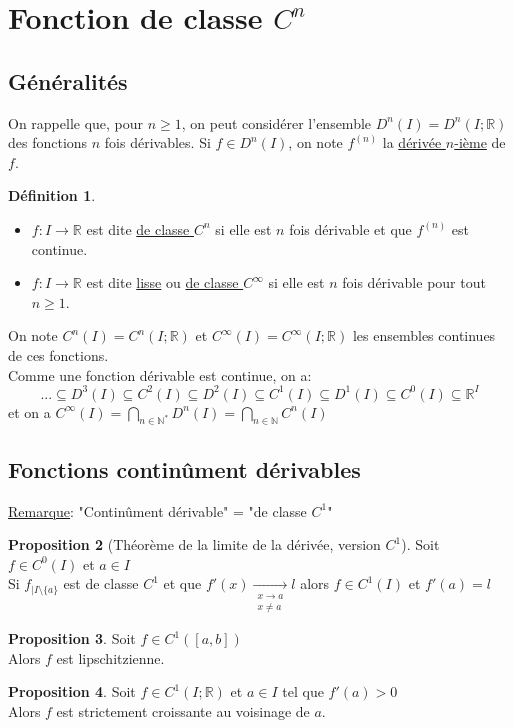 \documentclass[10pt,a4paper]{article}
\theoremstyle{definition}
\newtheorem{proposition}{Proposition}[section]
\newtheorem{definition}[proposition]{Définition}
\begin{document}
\section{Fonction de classe $C^n$}
\subsection{Généralités}
On rappelle que, pour $n \geq 1$, on peut considérer l'ensemble $D^n(I) = D^n(I; \mathbb{R})$ des fonctions $n$ fois dérivables. Si $f \in D^n(I)$, on note $f^{(n)}$ la \uline{dérivée $n$-ième} de $f$.
\begin{definition}
\hfill
\begin{itemize}
\item $f: I \to \mathbb{R}$ est dite \uline{de classe $C^n$} si elle est $n$ fois dérivable et que $f^{(n)}$ est continue.
\item $f: I \to \mathbb{R}$ est dite \uline{lisse} ou \uline{de classe $C^\infty$} si elle est $n$ fois dérivable pour tout $n \geq 1$.
\end{itemize}
On note $C^n(I) = C^n(I; \mathbb{R})$ et $C^\infty(I) = C^\infty(I; \mathbb{R})$ les ensembles continues de ces fonctions. \\
Comme une fonction dérivable est continue, on a:
\[ ... \subseteq D^3(I) \subseteq C^2(I) \subseteq D^2(I) \subseteq C^1(I) \subseteq D^1(I) \subseteq C^0(I) \subseteq \mathbb{R}^I\]
et on a $C^\infty(I) = \bigcap\limits_{n \in \mathbb{N}^*} D^n(I) = \bigcap\limits_{n \in \mathbb{N}} C^n(I)$
\end{definition}

\subsection{Fonctions continûment dérivables}
\uline{Remarque}: "Continûment dérivable" = "de classe $C^1$"
\begin{proposition}[Théorème de la limite de la dérivée, version $C^1$]
Soit $f \in C^0(I)$ et $a \in I$ \\
Si $f_{|I \setminus \{ a \}}$ est de classe $C^1$ et que $f'(x) \xrightarrow[\substack{x \to a \\ x \neq a}]{} l$ alors $f \in C^1(I)$ et $f'(a) = l$
\end{proposition}
\begin{proposition}
Soit $f \in C^1([a, b])$ \\
Alors $f$ est lipschitzienne.
\end{proposition}
\begin{proposition}
Soit $f \in C^1(I; \mathbb{R})$ et $a \in I$ tel que $f'(a) > 0$ \\
Alors $f$ est strictement croissante au voisinage de $a$.
\end{proposition}
\end{document}
